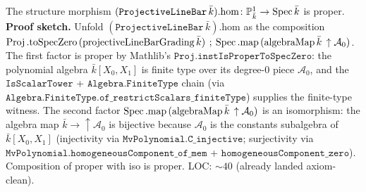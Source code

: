 \begin{lemma}
  \label{lem:projectiveLineBar_isProper}
  The structure morphism \((\mathtt{ProjectiveLineBar}\,\bar k).\mathrm{hom}
  \colon \mathbb P^1_{\bar k} \to \operatorname{Spec} \bar k\) is proper.
  \medskip
  \noindent\textbf{Proof sketch.} Unfold \((\mathtt{ProjectiveLineBar}\,\bar k)
  .\mathrm{hom}\) as the composition
  \(\operatorname{Proj}.\mathrm{toSpecZero}\,(\mathrm{projectiveLineBarGrading}\,\bar k)
  \mathbin{\,;\,} \operatorname{Spec}.\mathrm{map}\,(\mathrm{algebraMap}\,\bar k\,
  \uparrow{\mathcal A_0})\). The first factor is proper by Mathlib's
  \(\mathtt{Proj.instIsProperToSpecZero}\): the polynomial algebra
  \(\bar k[X_0, X_1]\) is finite type over its degree-\(0\) piece
  \(\mathcal A_0\), and the \(\mathtt{IsScalarTower}\) +
  \(\mathtt{Algebra.FiniteType}\) chain (via
  \(\mathtt{Algebra.FiniteType.of\_restrictScalars\_finiteType}\)) supplies the
  finite-type witness. The second factor \(\operatorname{Spec}.\mathrm{map}\,(\mathrm{algebraMap}
  \,\bar k\,\uparrow{\mathcal A_0})\) is an isomorphism: the algebra map
  \(\bar k \to \uparrow{\mathcal A_0}\) is bijective because \(\mathcal A_0\)
  is the constants subalgebra of \(\bar k[X_0, X_1]\) (injectivity via
  \(\mathtt{MvPolynomial.C\_injective}\); surjectivity via
  \(\mathtt{MvPolynomial.homogeneousComponent\_of\_mem}\) +
  \(\mathtt{homogeneousComponent\_zero}\)). Composition of proper with iso is
  proper. LOC: \(\sim 40\) (already landed axiom-clean).
\end{lemma}
